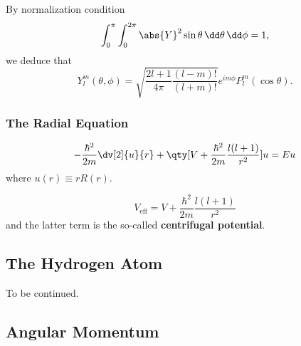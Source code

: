 By normalization condition
\[
	\int_{0}^{\pi} \int_0^{2\pi} \abs{Y}^2\sin\theta \,\dd \theta\,\dd\phi=1
,\] 
we deduce that
\[
    Y^m_l(\theta,\phi)
	=
	\sqrt{\frac{2l+1}{4\pi}\frac{(l-m)!}{(l+m)!}}e^{im\phi}P^m_l(\cos\theta)
.\] 
\subsubsection{The Radial Equation}
\begin{thm}
	\[
		-\frac{\hbar^2}{2m}\dv[2]{u}{r}+\qty[V+\frac{\hbar^2}{2m}\frac{l(l+1)}{r^2}]u=Eu
	\] 
	where $u(r)\equiv rR(r)$.
\end{thm}
\begin{remark}
	\[
		V_{\mathrm{eff}}=V+\frac{\hbar^2}{2m}\frac{l(l+1)}{r^2}
	\] and the latter term is the so-called \textbf{centrifugal potential}.
\end{remark}

\subsection{The Hydrogen Atom}
To be continued.

\subsection{Angular Momentum}


